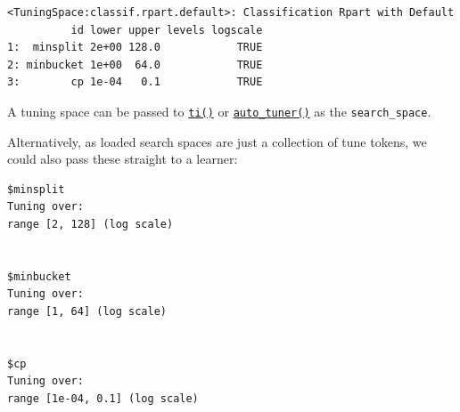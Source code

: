 \begin{Shaded}
\begin{Highlighting}[]
\OtherTok{=} \NormalTok{(}\NormalTok{)}
\end{Highlighting}
\end{Shaded}

\begin{verbatim}
<TuningSpace:classif.rpart.default>: Classification Rpart with Default
          id lower upper levels logscale
1:  minsplit 2e+00 128.0            TRUE
2: minbucket 1e+00  64.0            TRUE
3:        cp 1e-04   0.1            TRUE
\end{verbatim}

A tuning space can be passed to
\href{https://mlr3tuning.mlr-org.com/reference/ti.html}{\texttt{ti()}}
or
\href{https://mlr3tuning.mlr-org.com/reference/auto_tuner.html}{\texttt{auto\_tuner()}}
as the \texttt{search\_space}.

\begin{Shaded}
\begin{Highlighting}[]
\OtherTok{=} \NormalTok{(}
   \NormalTok{(}\NormalTok{),}
   \NormalTok{(}\NormalTok{, } \NormalTok{),}
   \NormalTok{(}\NormalTok{),}
   \NormalTok{(}\NormalTok{, } \NormalTok{),}
\NormalTok{)}
\end{Highlighting}
\end{Shaded}

Alternatively, as loaded search spaces are just a collection of tune
tokens, we could also pass these straight to a learner:

\begin{Shaded}
\begin{Highlighting}[]
\OtherTok{=}\SpecialCharTok{$}
\end{Highlighting}
\end{Shaded}

\begin{verbatim}
$minsplit
Tuning over:
range [2, 128] (log scale)


$minbucket
Tuning over:
range [1, 64] (log scale)


$cp
Tuning over:
range [1e-04, 0.1] (log scale)
\end{verbatim}

